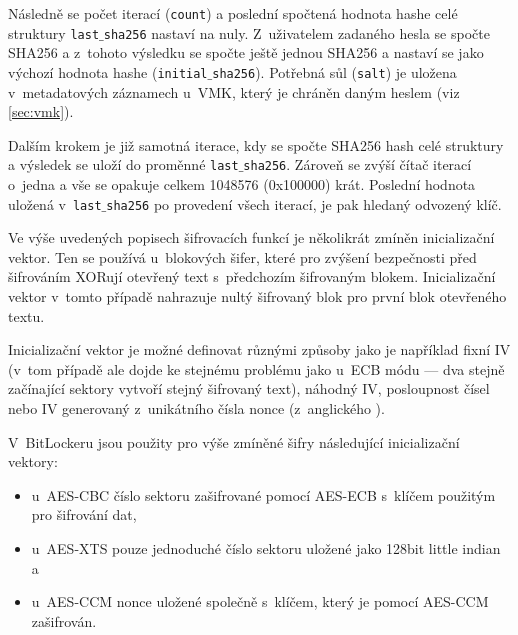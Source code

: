 Následně se počet iterací (\texttt{count}) a poslední spočtená hodnota hashe celé struktury \texttt{last$\_$sha256} nastaví na nuly. Z~uživatelem zadaného hesla se spočte SHA256 a z~tohoto výsledku se spočte ještě jednou SHA256 a nastaví se jako výchozí hodnota hashe (\texttt{initial$\_$sha256}). Potřebná sůl (\texttt{salt}) je uložena v~metadatových záznamech u~VMK, který je chráněn daným heslem (viz \ref{sec:vmk}).

Dalším krokem je již samotná iterace, kdy se spočte SHA256 hash celé struktury a výsledek se uloží do proměnné \texttt{last$\_$sha256}. Zároveň se zvýší čítač iterací o~jedna a vše se opakuje celkem 1048576 (0x100000) krát. Poslední hodnota uložená v~\texttt{last$\_$sha256} po provedení všech iterací, je pak hledaný odvozený klíč.\cite{Metz2011,Agostini2019}

\label{sec:iv}

Ve výše uvedených popisech šifrovacích funkcí je několikrát zmíněn inicializační vektor. Ten se používá u~blokových šifer, které pro zvýšení bezpečnosti před šifrováním XORují otevřený text s~předchozím šifrovaným blokem. Inicializační vektor v~tomto případě nahrazuje nultý šifrovaný blok pro první blok otevřeného textu.

Inicializační vektor je možné definovat různými způsoby jako je například fixní IV (v~tom případě ale dojde ke stejnému problému jako u~ECB módu --- dva stejně začínající sektory vytvoří stejný šifrovaný text), náhodný IV, posloupnost čísel nebo IV generovaný z~unikátního čísla nonce (z~anglického ).\cite{Kohnoc2010}

V~BitLockeru jsou použity pro výše zmíněné šifry následující inicializační vektory:
\begin{itemize}
	\item u~AES-CBC číslo sektoru zašifrované pomocí AES-ECB s~klíčem použitým pro šifrování dat,
	\item u~AES-XTS pouze jednoduché číslo sektoru uložené jako 128bit little indian a
	\item u~AES-CCM nonce uložené společně s~klíčem, který je pomocí AES-CCM zašifrován. \cite{Metz2011}
\end{itemize}


